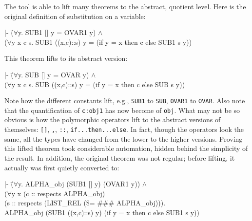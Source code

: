\documentclass[envcountsame,runningheads]{llncs}
\begin{document}
The tool is able to lift many theorems to the abstract, quotient level.
Here is the original definition of substitution on a variable:
{\tt \begin{tabbing}
|- \=($\forall$y. SUB1 [] y = OVAR1 y) $\wedge$ \\
\> ($\forall$y x c s. SUB1 ((x,c)::s) y = (if y = x then c else SUB1 s y))
\end{tabbing}}
This theorem lifts to its abstract version:
{\tt \begin{tabbing}
|- \=($\forall$y. SUB [] y = OVAR y) $\wedge$ \\
\> ($\forall$y x c s. SUB ((x,c)::s) y = (if y = x then c else SUB s y))
\end{tabbing}}
Note how the different constants lift, e.g., {\tt SUB1} to {\tt SUB},
{\tt OVAR1} to {\tt OVAR}.  Also note that the quantification of 
{\tt c:obj1} has now become of {\tt obj}.
What may not be so obvious is how the
polymorphic operators lift to the abstract versions of themselves:
{\tt []}, {\tt ,}, {\tt ::}, {\tt if...then...else}.
In fact, though the operators look the same, all the types have changed
from the lower to the higher versions.
Proving this lifted theorem took considerable automation,
hidden behind
the simplicity of the result.
In addition, the original theorem was not regular; before lifting,
it actually was first quietly converted to:
{\tt \begin{tabbing}
|- \=($\forall$y. ALPHA\_obj (SUB1 [] y) (OVAR1 y)) $\wedge$ \\
\>   (\=$\forall$y x \=(c :: respects ALPHA\_obj) \\
\>\>\> (s :: respects (LIST\_REL (\$= \#\#\# ALPHA\_obj))). \\
\>\>  ALPHA\_obj (SUB1 ((x,c)::s) y) (if y = x then c else SUB1 s y))
\end{tabbing}}
\end{document}
